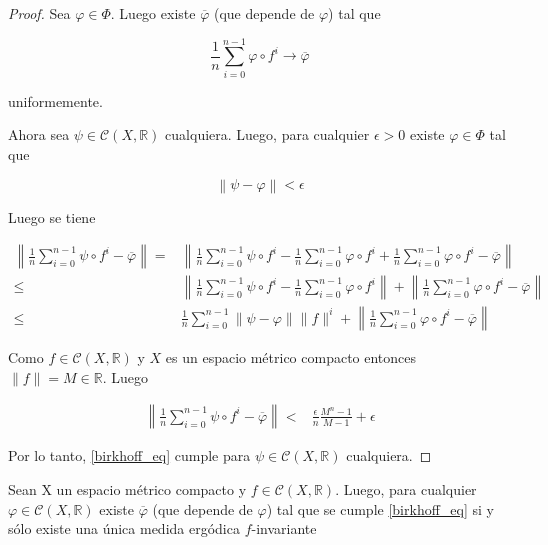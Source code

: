 \begin{proof}
	Sea $\varphi \in \Phi$. Luego existe $\overline{\varphi}$ (que depende de $\varphi$) tal que
	
	\begin{equation}
		\frac{1}{n} \sum_{i=0}^{n-1} \varphi \circ f^i \rightarrow \overline{\varphi}
	\end{equation}
	
	uniformemente.
	
	Ahora sea $\psi \in \mathcal{C}(X,\mathbb{R})$ cualquiera. Luego, para cualquier $\epsilon>0$ existe $\varphi \in \Phi$ tal que
	
	\begin{equation}
		\left\| \psi - \varphi \right\| < \epsilon
	\end{equation}
	
	Luego se tiene
	
	\begin{align}
		\left\| \frac{1}{n} \sum_{i=0}^{n-1} \psi \circ f^i - \overline{\varphi} \right\| =& \left\| \frac{1}{n} \sum_{i=0}^{n-1} \psi \circ f^i - \frac{1}{n} \sum_{i=0}^{n-1} \varphi \circ f^i + \frac{1}{n} \sum_{i=0}^{n-1} \varphi \circ f^i - \overline{\varphi} \right\|\\		
		\leq & \left\| \frac{1}{n} \sum_{i=0}^{n-1} \psi \circ f^i - \frac{1}{n} \sum_{i=0}^{n-1} \varphi \circ f^i \right\| + \left\| \frac{1}{n} \sum_{i=0}^{n-1} \varphi \circ f^i - \overline{\varphi} \right\|\\
		\leq & \frac{1}{n} \sum_{i=0}^{n-1} \| \psi - \varphi \| \| f \|^i + \left\| \frac{1}{n} \sum_{i=0}^{n-1} \varphi \circ f^i - \overline{\varphi} \right\|
	\end{align}
	
	Como $f \in \mathcal{C}(X,\mathbb{R})$ y $X$ es un espacio métrico compacto entonces \mbox{$\|f\|=M \in \mathbb{R}$}. Luego
	
	\begin{align}
		\left\| \frac{1}{n} \sum_{i=0}^{n-1} \psi \circ f^i - \overline{\varphi} \right\| < & \frac{\epsilon}{n} \frac{M^n-1}{M-1} + \epsilon
	\end{align}
	
	Por lo tanto, \eqref{birkhoff_eq} cumple para $\psi \in \mathcal{C}(X,\mathbb{R})$ cualquiera.
\end{proof}

\begin{lema}\label{lema_varphi_continua}
	Sean X un espacio métrico compacto y $f \in \mathcal{C}(X,\mathbb{R})$. Luego, para cualquier $\varphi \in \mathcal{C}(X,\mathbb{R})$ existe $\overline{\varphi}$ (que depende de $\varphi$) tal que se cumple \eqref{birkhoff_eq} si y sólo existe una única medida ergódica $f$-invariante
\end{lema}

